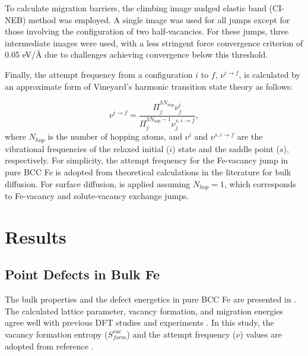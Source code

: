 \documentclass[preprint,12pt]{elsarticle}
\begin{document}
To calculate migration barriers, the climbing image nudged elastic band (CI-NEB) method \cite{henkelman_climbing_2000} was employed. A single image was used for all jumps except for those involving the configuration of two half-vacancies. For these jumps, three intermediate images were used, with a less stringent force convergence criterion of 0.05 eV/{\AA} due to challenges achieving convergence below this threshold.


Finally, the attempt frequency from a configuration $i$ to $f$, $\nu^{i\rightarrow f}$, is calculated by an approximate form of Vineyard's harmonic transition state theory \cite{vineyard_frequency_1957} as follows:

\begin{equation}
    \label{eq:attempt_freq}
    \nu^{i\rightarrow f} = \frac{\Pi^{3N_{hop}}_j  \nu^{i}_j}{\Pi^{3N_{hop}-1}_j  \nu^{s,i\rightarrow f}_j},
\end{equation}
where $N_{hop}$ is the number of hopping atoms, and $\nu^{i}$ and $\nu^{s,i\rightarrow f}$ are the vibrational frequencies of the relaxed initial ($i$) state and the saddle point ($s$), respectively. For simplicity, the attempt frequency for the Fe-vacancy jump in pure BCC Fe is adopted from theoretical calculations in the literature \cite{messina_systematic_2016} for bulk diffusion. For surface diffusion,  is applied
assuming $N_{hop}=1$, which corresponds to Fe-vacancy and solute-vacancy exchange jumps.


\FloatBarrier
\section{Results}

\subsection{Point Defects in Bulk Fe}

\noindent The bulk properties and the defect energetics in pure BCC Fe are presented in . The calculated lattice parameter, vacancy formation, and migration energies agree well with previous DFT studies \cite{messina_exact_2014, murali_bcc_fe_2015, yang_significant_2023, Li_magnetic_2021, choudhury2011ab} and experiments \cite{kittel2018introduction, schepper_positron1983, tapasa2007computer}. In this study, the vacancy formation entropy ($S_{form}^{vac}$) and the attempt frequency ($\nu$) values are adopted from reference \cite{messina_systematic_2016}. 
\end{document}
